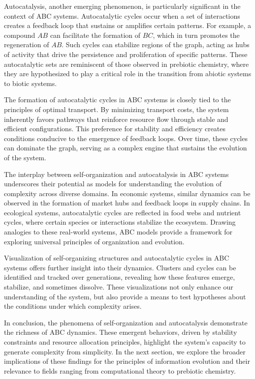 \documentclass[%
 preprint, linenumbers,
 amsmath,amssymb,
 aps, physrev,
]{revtex4-2}
\begin{document}
Autocatalysis, another emerging phenomenon, is particularly significant in the context of ABC systems. Autocatalytic cycles occur when a set of interactions creates a feedback loop that sustains or amplifies certain patterns. For example, a compound $AB$ can facilitate the formation of $BC$, which in turn promotes the regeneration of $AB$. Such cycles can stabilize regions of the graph, acting as hubs of activity that drive the persistence and proliferation of specific patterns. These autocatalytic sets are reminiscent of those observed in prebiotic chemistry, where they are hypothesized to play a critical role in the transition from abiotic systems to biotic systems.

The formation of autocatalytic cycles in ABC systems is closely tied to the principles of optimal transport. By minimizing transport costs, the system inherently favors pathways that reinforce resource flow through stable and efficient configurations. This preference for stability and efficiency creates conditions conducive to the emergence of feedback loops. Over time, these cycles can dominate the graph, serving as a complex engine that sustains the evolution of the system.

The interplay between self-organization and autocatalysis in ABC systems underscores their potential as models for understanding the evolution of complexity across diverse domains. In economic systems, similar dynamics can be observed in the formation of market hubs and feedback loops in supply chains. In ecological systems, autocatalytic cycles are reflected in food webs and nutrient cycles, where certain species or interactions stabilize the ecosystem. Drawing analogies to these real-world systems, ABC models provide a framework for exploring universal principles of organization and evolution.

Visualization of self-organizing structures and autocatalytic cycles in ABC systems offers further insight into their dynamics. Clusters and cycles can be identified and tracked over generations, revealing how these features emerge, stabilize, and sometimes dissolve. These visualizations not only enhance our understanding of the system, but also provide a means to test hypotheses about the conditions under which complexity arises.

In conclusion, the phenomena of self-organization and autocatalysis demonstrate the richness of ABC dynamics. These emergent behaviors, driven by stability constraints and resource allocation principles, highlight the system’s capacity to generate complexity from simplicity. In the next section, we explore the broader implications of these findings for the principles of information evolution and their relevance to fields ranging from computational theory to prebiotic chemistry.
\end{document}
